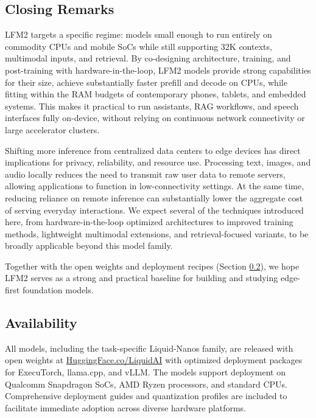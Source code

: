 \documentclass{article}
\begin{document}
\subsection{Closing Remarks}
LFM2 targets a specific regime: models small enough to run entirely on commodity CPUs and mobile SoCs while still supporting 32K contexts, multimodal inputs, and retrieval. By co-designing architecture, training, and post-training with hardware-in-the-loop, LFM2 models provide strong capabilities for their size, achieve substantially faster prefill and decode on CPUs, while fitting within the RAM budgets of contemporary phones, tablets, and embedded systems. This makes it practical to run assistants, RAG workflows, and speech interfaces fully on-device, without relying on continuous network connectivity or large accelerator clusters.

Shifting more inference from centralized data centers to edge devices has direct implications for privacy, reliability, and resource use. Processing text, images, and audio locally reduces the need to transmit raw user data to remote servers, allowing applications to function in low-connectivity settings. At the same time, reducing reliance on remote inference can substantially lower the aggregate cost of serving everyday interactions. We expect several of the techniques introduced here, from hardware-in-the-loop optimized architectures to improved training methods, lightweight multimodal extensions, and retrieval-focused variants, to be broadly applicable beyond this model family. 

Together with the open weights and deployment recipes (Section \ref{subsed:avail}), we hope LFM2 serves as a strong and practical baseline for building and studying edge-first foundation models.



\subsection{Availability}
\label{subsed:avail}
All models, including the task-specific Liquid-Nanos family, are released with open weights at \href{https://huggingface.co/LiquidAI}{HuggingFace.co/LiquidAI} with optimized deployment packages for ExecuTorch, llama.cpp, and vLLM. The models support deployment on Qualcomm Snapdragon SoCs, AMD Ryzen processors, and standard CPUs. Comprehensive deployment guides and quantization profiles are included to facilitate immediate adoption across diverse hardware platforms.
\end{document}

